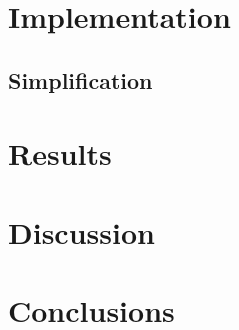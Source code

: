 \documentclass[a4paper]{article}
\begin{document}
\section{Implementation}

\subsection{Simplification}

\section{Results}

\section{Discussion}

\section{Conclusions}
\end{document}
